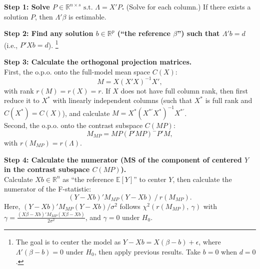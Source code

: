 \documentclass{article}
\theoremstyle{break}
\newcommand{\R}{\ensuremath{\mathbb{R}}}
\newcommand{\E}{\ensuremath{\mathbb{E}}}
\newcommand{\st}{\ensuremath{\text{ s.t. }}}
\begin{document}
\textbf{Step 1: Solve $P \in \R^{n \times s} \st \Lambda = X'P$.} (Solve for each column.) If there exists a solution $P$, then $\Lambda'\beta$ is estimable.

\textbf{Step 2: Find any solution $b \in \R^p$ (``the reference $\beta$'') such that $\Lambda'b = d$}\; (i.e., $P'Xb = d$).
\footnote{The goal is to center the model as $Y-Xb=X(\beta-b)+\epsilon$, where $\Lambda'(\beta-b)=0$ under $H_0$, then apply previous results. Take $b=0$ when $d=0$.}

\textbf{Step 3: Calculate the orthogonal projection matrices.}\\
First, the o.p.o. onto the full-model mean space $C(X)$:
\[
M = X (X'X)^{-1} X',
\]
with rank $r(M) = r(X) = r$. If $X$ does not have full column rank, then first reduce it to $X^*$ with linearly independent columns (such that $X^*$ is full rank and $C(X^*) = C(X)$), and calculate $M = X^* (X^{*'}X^*)^{-1} X^{*'}$.\\
Second, the o.p.o. onto the contrast subspace $C(MP)$:
\[
M_{MP} = MP (P'MP)^- P'M,
\]
with $r(M_{MP}) = r(\Lambda)$.




\textbf{Step 4: Calculate the numerator (MS of the component of centered $Y$ in the contrast subspace $C(MP)$).}\\
Calculate $Xb \in \R^n$ as ``the reference $\E[Y]$'' to center $Y$, then calculate the numerator of the F-statistic:
\[
(Y - Xb)' M_{MP} (Y-Xb)\ /\ r(M_{MP}).
\]
Here, $(Y - Xb)' M_{MP} (Y-Xb)/\sigma^2$ follows $\chi^2(r(M_{MP}),\ \gamma)$ with $\gamma = \frac{(X\beta - Xb)' M_{MP} (X\beta - Xb)}{2 \sigma^2}$, and $\gamma=0$ under $H_0$.
\end{document}
